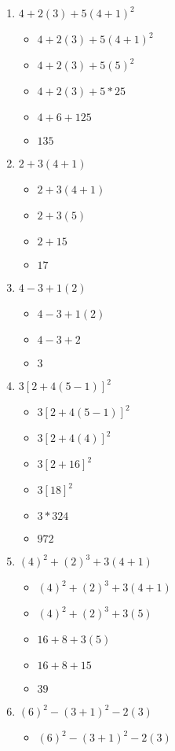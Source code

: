 \documentclass{article}
\begin{document}
\newpage
\begin{enumerate}
\item $4+2(3)+5(4+1)^{2}$
  \begin{itemize}
  \item $4+2(3)+5(4+1)^{2}$
  \item $4+2(3)+5(5)^{2}$
  \item $4+2(3)+5*25$
  \item $4+6+125$
  \item $135$
  \end{itemize}
\item $2+3(4+1)$
  \begin{itemize}
  \item $2+3(4+1)$
  \item $2+3(5)$
  \item $2+15$
  \item $17$
  \end{itemize}
\item $4-3+1(2)$
  \begin{itemize}
  \item $4-3+1(2)$
  \item $4-3+2$
  \item $3$
  \end{itemize}
\item $3[2+4(5-1)]^{2}$
  \begin{itemize}
  \item $3[2+4(5-1)]^{2}$
  \item $3[2+4(4)]^{2}$
  \item $3[2+16]^{2}$
  \item $3[18]^{2}$
  \item $3*324$
  \item $972$
  \end{itemize}
\item $(4)^{2}+(2)^{3}+3(4+1)$
  \begin{itemize}
  \item $(4)^{2}+(2)^{3}+3(4+1)$
  \item $(4)^{2}+(2)^{3}+3(5)$
  \item $16+8+3(5)$
  \item $16+8+15$
  \item $39$
  \end{itemize}
\item $(6)^{2}-(3+1)^{2}-2(3)$
  \begin{itemize}
  \item $(6)^{2}-(3+1)^{2}-2(3)$

\end{itemize}
\end{enumerate}
\end{document}
